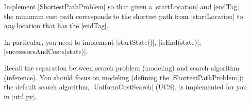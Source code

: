 \item {}

Implement |ShortestPathProblem| so that given a |startLocation| and |endTag|, the minimum cost path corresponds to the shortest path from |startLocation| to \textit{any} location that has the |endTag|.
  
In particular, you need to implement |startState()|, |isEnd(state)|, |successorsAndCosts(state)|.

Recall the separation between search problem (modeling) and search algorithm (inference). You should focus on modeling (defining the |ShortestPathProblem|); the default search algorithm, |UniformCostSearch| (UCS), is implemented for you in |util.py|.


